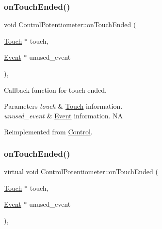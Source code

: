 \subsubsection{\texorpdfstring{on\+Touch\+Ended()}{onTouchEnded()}\hspace{0.1cm}{\footnotesize\ttfamily [1/2]}}
{\footnotesize\ttfamily void Control\+Potentiometer\+::on\+Touch\+Ended (\begin{DoxyParamCaption}\item[{\hyperlink{classTouch}{Touch} $\ast$}]{touch,  }\item[{\hyperlink{classEvent}{Event} $\ast$}]{unused\+\_\+event }\end{DoxyParamCaption})\hspace{0.3cm}{\ttfamily [override]}, {\ttfamily [virtual]}}

Callback function for touch ended.


\begin{DoxyParams}{Parameters}
{\em touch} & \hyperlink{classTouch}{Touch} information. \\
\hline
{\em unused\+\_\+event} & \hyperlink{classEvent}{Event} information.  NA \\
\hline
\end{DoxyParams}


Reimplemented from \hyperlink{classControl_a56073e57060169fe80cbb6ce1f4abe28}{Control}.

\mbox{\label{classControlPotentiometer_adb487a04c463b3cfbf63be0957cee24c}} 
\subsubsection{\texorpdfstring{on\+Touch\+Ended()}{onTouchEnded()}\hspace{0.1cm}{\footnotesize\ttfamily [2/2]}}
{\footnotesize\ttfamily virtual void Control\+Potentiometer\+::on\+Touch\+Ended (\begin{DoxyParamCaption}\item[{\hyperlink{classTouch}{Touch} $\ast$}]{touch,  }\item[{\hyperlink{classEvent}{Event} $\ast$}]{unused\+\_\+event }\end{DoxyParamCaption})\hspace{0.3cm}{\ttfamily [override]}, {\ttfamily [virtual]}}

